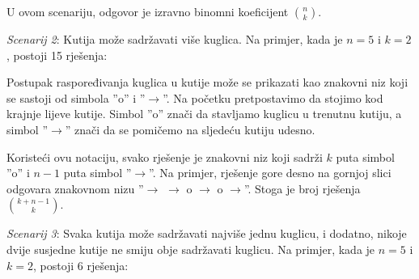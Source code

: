 U ovom scenariju, odgovor je izravno
binomni koeficijent ${n \choose k}$.

\textit{Scenarij 2}: Kutija može sadržavati više kuglica.
Na primjer, kada je $n=5$ i $k=2$,
postoji 15 rješenja:

\begin{center}
\end{center}

Postupak raspoređivanja kuglica u kutije
može se prikazati kao znakovni niz
koji se sastoji od simbola
''o'' i ''$\rightarrow$''.
Na početku pretpostavimo da stojimo kod krajnje lijeve kutije.
Simbol ''o'' znači da stavljamo kuglicu
u trenutnu kutiju, a simbol
''$\rightarrow$'' znači da se pomičemo
na sljedeću kutiju udesno.

Koristeći ovu notaciju, svako rješenje je znakovni niz
koji sadrži $k$ puta simbol ''o'' i
$n-1$ puta simbol ''$\rightarrow$''.
Na primjer, rješenje gore desno
na gornjoj slici odgovara znakovnom nizu
''$\rightarrow$ $\rightarrow$ o $\rightarrow$ o $\rightarrow$''.
Stoga je broj rješenja
${k+n-1 \choose k}$.

\textit{Scenarij 3}: Svaka kutija može sadržavati najviše jednu kuglicu,
i dodatno, nikoje dvije susjedne kutije ne smiju obje sadržavati kuglicu.
Na primjer, kada je $n=5$ i $k=2$,
postoji 6 rješenja:


